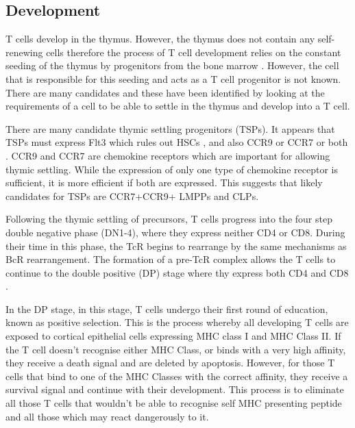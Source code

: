 \subsection{Development}

T cells develop in the thymus.
However, the thymus does not contain any self-renewing cells therefore the process of T cell development relies on the constant seeding of the thymus by progenitors from the bone marrow \citep{Zlotoff2011}.
However, the cell that is responsible for this seeding and acts as a T cell progenitor is not known.
There are many candidates and these have been identified by looking at the requirements of a cell to be able to settle in the thymus and develop into a T cell.

There are many candidate thymic settling progenitors (TSPs).
It appears that TSPs must express Flt3 which rules out HSCs \citep{Zlotoff2011}, and also CCR9 or CCR7 or both \citep{Zlotoff2010}.
CCR9 and CCR7 are chemokine receptors which are important for allowing thymic settling. 
While the expression of only one type of chemokine receptor is sufficient, it is more efficient if both are expressed.
This suggests that likely candidates for TSPs are CCR7+CCR9+ LMPPs and CLPs\citep{Zlotoff2011}.


Following the thymic settling of precursors, T cells progress into the four step double negative phase (DN1-4), where they express neither CD4 or CD8.
During their time in this phase, the TcR begins to rearrange by the same mechanisms as BcR rearrangement.
The formation of a pre-TcR complex allows the T cells to continue to the double positive (DP) stage where thy express both CD4 and CD8 \citep{Zuniga1996}.

In the DP stage, in this stage, T cells undergo their first round of education, known as positive selection.
This is the process whereby all developing T cells are exposed to cortical epithelial cells expressing MHC class I and MHC Class II.
If the T cell doesn't recognise either MHC Class, or binds with a very high affinity, they receive a death signal and are deleted by apoptosis.
However, for those T cells that bind to one of the MHC Classes with the correct affinity, they receive a survival signal and continue with their development.
This process is to eliminate all those T cells that wouldn't be able to recognise self MHC presenting peptide and all those which  may react dangerously to it.

